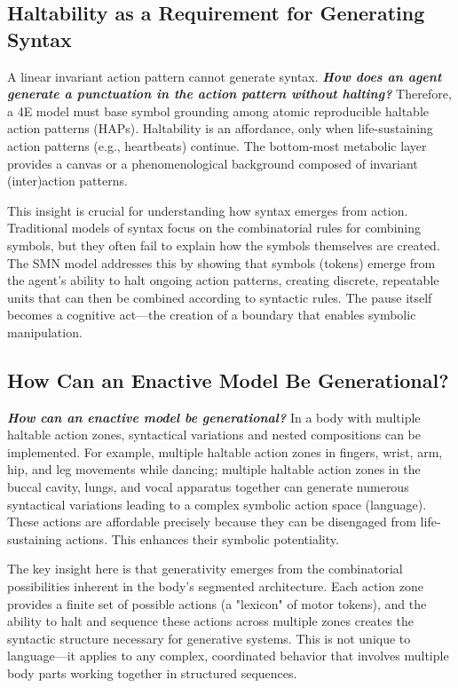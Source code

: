 \subsection{Haltability as a Requirement for Generating Syntax}
A linear invariant action pattern cannot generate syntax. \textbf{\textit{How does an agent generate a punctuation in the action pattern without halting?}} Therefore, a 4E model must base symbol grounding among atomic reproducible haltable action patterns (HAPs). Haltability is an affordance, only when life-sustaining action patterns (e.g., heartbeats) continue. The bottom-most metabolic layer provides a canvas or a phenomenological background composed of invariant (inter)action patterns.

This insight is crucial for understanding how syntax emerges from action. Traditional models of syntax focus on the combinatorial rules for combining symbols, but they often fail to explain how the symbols themselves are created. The SMN model addresses this by showing that symbols (tokens) emerge from the agent's ability to halt ongoing action patterns, creating discrete, repeatable units that can then be combined according to syntactic rules. The pause itself becomes a cognitive act—the creation of a boundary that enables symbolic manipulation.

\subsection{How Can an Enactive Model Be Generational?}
\textbf{\textit{How can an enactive model be generational?}} In a body with multiple haltable action zones, syntactical variations and nested compositions can be implemented. For example, multiple haltable action zones in fingers, wrist, arm, hip, and leg movements while dancing; multiple haltable action zones in the buccal cavity, lungs, and vocal apparatus together can generate numerous syntactical variations leading to a complex symbolic action space (language). These actions are affordable precisely because they can be disengaged from life-sustaining actions. This enhances their symbolic potentiality.

The key insight here is that generativity emerges from the combinatorial possibilities inherent in the body's segmented architecture. Each action zone provides a finite set of possible actions (a "lexicon" of motor tokens), and the ability to halt and sequence these actions across multiple zones creates the syntactic structure necessary for generative systems. This is not unique to language—it applies to any complex, coordinated behavior that involves multiple body parts working together in structured sequences.

